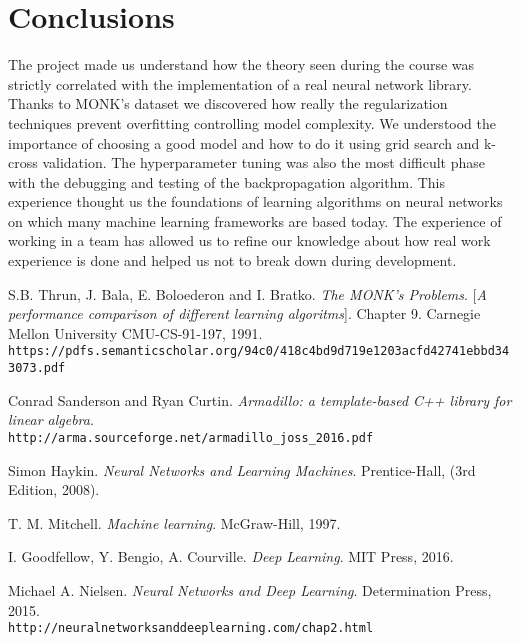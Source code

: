 \section{Conclusions}
The project made us understand how the theory seen during the course was strictly correlated with the implementation of a real neural network library. Thanks to MONK's dataset we discovered how really the regularization techniques prevent overfitting controlling model complexity. We understood the importance of choosing a good model and how to do it using grid search and k-cross validation. The hyperparameter tuning was also the most difficult phase with the debugging and testing of the backpropagation algorithm. This experience thought us the foundations of learning algorithms on neural networks on which many machine learning frameworks are based today. The experience of working in a team has allowed us to refine our knowledge about how real work experience is done and helped us not to break down during development.



\begin{thebibliography}{9}
	S.B. Thrun, J. Bala, E. Boloederon and I. Bratko.
	\textit{The MONK's Problems}. 
	[\textit{A performance comparison of different learning algoritms}]. Chapter 9.
	Carnegie Mellon University CMU-CS-91-197, 1991.
	\\\texttt{https://pdfs.semanticscholar.org/94c0/418c4bd9d719e1203acfd42741ebbd343073.pdf}
	
	Conrad Sanderson and Ryan Curtin. 
	\textit{Armadillo: a template-based C++ library for linear algebra}. 
	\\\texttt{http://arma.sourceforge.net/armadillo\_joss\_2016.pdf}

	
	Simon Haykin. 
	\textit{Neural Networks and Learning Machines}. 
	Prentice-Hall, (3rd Edition, 2008).


	T. M. Mitchell. 
	\textit{Machine learning}. 
	McGraw-Hill, 1997.
	
	I. Goodfellow, Y. Bengio, A. Courville. 
	\textit{Deep Learning}. 
	MIT Press,  2016.
	
	Michael A. Nielsen. 
	\textit{Neural Networks and Deep Learning}. 
	Determination Press, 2015.
	\\\texttt{http://neuralnetworksanddeeplearning.com/chap2.html}
\end{thebibliography}



